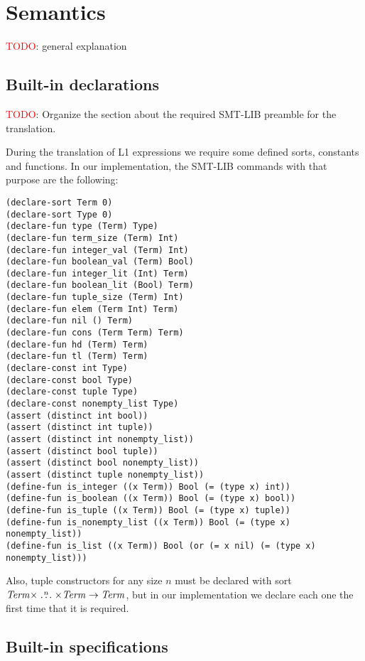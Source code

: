 \section{Semantics}

\textcolor{red}{TODO}: general explanation

\subsection{Built-in declarations}

\textcolor{red}{TODO}: Organize the section about the required SMT-LIB preamble for 
the translation.

During the translation of L1 expressions we require some 
defined sorts, constants and functions. In our implementation,
the SMT-LIB commands with that purpose are the following:

\begin{verbatim}
(declare-sort Term 0)
(declare-sort Type 0)
(declare-fun type (Term) Type)
(declare-fun term_size (Term) Int)
(declare-fun integer_val (Term) Int)
(declare-fun boolean_val (Term) Bool)
(declare-fun integer_lit (Int) Term)
(declare-fun boolean_lit (Bool) Term)
(declare-fun tuple_size (Term) Int)
(declare-fun elem (Term Int) Term)
(declare-fun nil () Term)
(declare-fun cons (Term Term) Term)
(declare-fun hd (Term) Term)
(declare-fun tl (Term) Term)
(declare-const int Type)
(declare-const bool Type)
(declare-const tuple Type)
(declare-const nonempty_list Type)
(assert (distinct int bool))
(assert (distinct int tuple))
(assert (distinct int nonempty_list))
(assert (distinct bool tuple))
(assert (distinct bool nonempty_list))
(assert (distinct tuple nonempty_list))
(define-fun is_integer ((x Term)) Bool (= (type x) int))
(define-fun is_boolean ((x Term)) Bool (= (type x) bool))
(define-fun is_tuple ((x Term)) Bool (= (type x) tuple))
(define-fun is_nonempty_list ((x Term)) Bool (= (type x) nonempty_list))
(define-fun is_list ((x Term)) Bool (or (= x nil) (= (type x) nonempty_list)))
\end{verbatim}

Also, tuple constructors for any size $n$ must be declared with sort 
$\mathit{Term} \times \stackrel{n}{\dots} 
\times \mathit{Term} \rightarrow \mathit{Term}$, but 
in our implementation we declare each one the first time that it is required.

\subsection{Built-in specifications}

